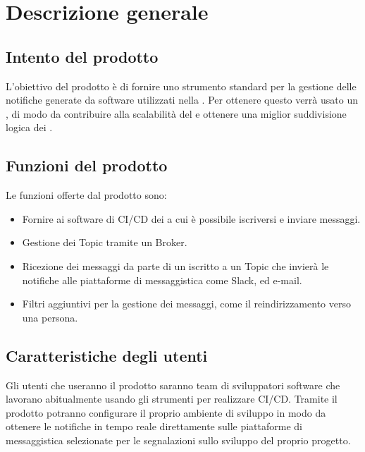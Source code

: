 \section{Descrizione generale}

	\subsection{Intento del prodotto}
    
    L'obiettivo del prodotto è di fornire uno strumento standard per la gestione delle notifiche generate da software utilizzati nella .
    Per ottenere questo verrà usato un , di modo da contribuire alla scalabilità del  e ottenere una miglior suddivisione logica dei .
	
	\subsection{Funzioni del prodotto}
	
    Le funzioni offerte dal prodotto sono:
    \begin{itemize}
		\item Fornire ai software di CI/CD dei  a cui è possibile iscriversi e inviare messaggi.
		\item Gestione dei Topic tramite un Broker.
        \item Ricezione dei messaggi da parte di un  iscritto a un Topic che invierà le notifiche alle piattaforme di messaggistica come Slack,  ed e-mail.
        \item Filtri aggiuntivi per la gestione dei messaggi, come il reindirizzamento verso una persona.
	\end{itemize}

	\subsection{Caratteristiche degli utenti}
    
    Gli utenti che useranno il prodotto saranno team di sviluppatori software che lavorano abitualmente usando gli strumenti per realizzare CI/CD.
    Tramite il prodotto potranno configurare il proprio ambiente di sviluppo in modo da ottenere le notifiche in tempo reale direttamente sulle piattaforme di messaggistica selezionate per le segnalazioni sullo sviluppo del proprio progetto.
	

